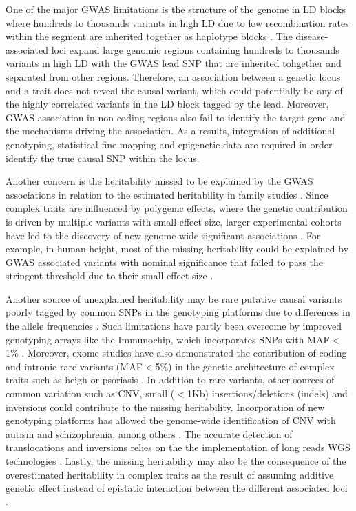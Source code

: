 One of the major GWAS limitations is the structure of the genome in LD blocks where hundreds to thousands variants in high LD due to low recombination rates within the segment are inherited together as haplotype blocks \parencite{}. The disease-associated loci expand large genomic regions containing hundreds to thousands variants in high LD with the GWAS lead SNP that are inherited tohgether and separated from other regions. Therefore, an association between a genetic locus and a trait does not reveal the causal variant, which could potentially be any of the highly correlated variants in the LD block tagged by the lead. Moreover, GWAS association in non-coding regions also fail to identify the target gene and the mechanisms driving the association. As a results, integration of additional genotyping, statistical fine-mapping and epigenetic data are required in order identify the true causal SNP within the locus.

Another concern is the heritability missed to be explained by the GWAS associations in relation to the estimated heritability in family studies \parencite{Ku2010, Yang2010}. Since complex traits are influenced by polygenic effects, where the genetic contribution is driven by multiple variants with small effect size, larger experimental cohorts have led to the discovery of new genome-wide significant associations \parencite{Visscher2017}. For example, in human height, most of the missing heritability could be explained by GWAS associated variants with nominal significance that failed to pass the stringent threshold due to their small effect size \parencite{Yang2010}. 

Another source of unexplained heritability may be rare putative causal variants poorly tagged by common SNPs in the genotyping platforms due to differences in the allele frequencies \parencite{Wray2005}. Such limitations have partly been overcome by improved genotyping arrays like the Immunochip, which incorporates SNPs with MAF${<}$1\% \parencite{Cortes2011}. Moreover, exome studies have also demonstrated the contribution of coding and intronic rare variants (MAF${<}$5\%) in the genetic architecture of complex traits such as heigh or psoriasis \parencite{ Marouli2017, Dand2017}. In addition to rare variants, other sources of common variation such as CNV, small ($<$1Kb) insertions/deletions (indels) and inversions could contribute to the missing heritability. Incorporation of new genotyping platforms has allowed the genome-wide identification of CNV with autism and schizophrenia, among others \parencite{Glessner2009,Marshall2017}. The accurate detection of translocations and inversions relies on the the implementation of long reads WGS technologies \parencite{Visscher2017}. Lastly, the missing heritability may also be the consequence of the overestimated heritability in complex traits as the result of assuming additive genetic effect instead of epistatic interaction between the different associated loci \parencite{Zuk2012}. 





